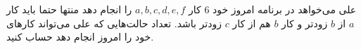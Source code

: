     \p 
علی می‌خواهد در برنامه امروز خود
$6$
کار
$a, b, c, d, e, f$
را انجام دهد منتها حتما باید کار
$a$
از
$b$
زودتر و کار
$b$
هم از کار
$c$
زودتر باشد. تعداد حالت‌هایی که علی می‌تواند کارهای خود را امروز انجام دهد حساب کنید.